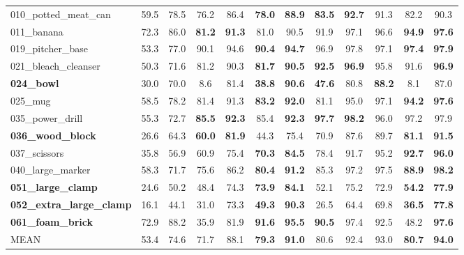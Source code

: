 \documentclass[twocolumn]{svjour3}
\begin{document}
\begin{table*}[t]
\begin{tabular}{l|c|c|c|c|c|c|c|c|c|c|c}
010\_potted\_meat\_can & 59.5 & 78.5 & 76.2 & 86.4 & \textbf{78.0} &\textbf{ 88.9} & \textbf{83.5} & \textbf{92.7} & 91.3 & 82.2 & 90.3 \\
011\_banana & 72.3 & 86.0 & \textbf{81.2 }& \textbf{91.3} & 81.0 & 90.5 & 91.9 & 97.1 & 96.6 & \textbf{94.9} & \textbf{97.6} \\
019\_pitcher\_base & 53.3 & 77.0 & 90.1 & 94.6 & \textbf{90.4} & \textbf{94.7} & 96.9 & 97.8 & 97.1 & \textbf{97.4} & \textbf{97.9} \\
021\_bleach\_cleanser & 50.3 & 71.6 & 81.2 & 90.3 & \textbf{81.7} &\textbf{ 90.5} & \textbf{92.5} & \textbf{96.9} & 95.8 & 91.6 & \textbf{96.9} \\
\textbf{024\_bowl} & 30.0 & 70.0 & 8.6 & 81.4 & \textbf{38.8} & \textbf{90.6} & \textbf{47.6} & 80.8 & \textbf{88.2} & 8.1 & 87.0 \\
025\_mug & 58.5 & 78.2 & 81.4 & 91.3 & \textbf{83.2} & \textbf{92.0} & 81.1 & 95.0 & 97.1 & \textbf{94.2} &\textbf{ 97.6} \\
035\_power\_drill & 55.3 & 72.7 & \textbf{85.5} & \textbf{92.3} & 85.4 & \textbf{92.3} & \textbf{97.7} & \textbf{98.2} & 96.0 & 97.2 & 97.9 \\
\textbf{036\_wood\_block} & 26.6 & 64.3 & \textbf{60.0} & \textbf{81.9} & 44.3 & 75.4 & 70.9 & 87.6 & 89.7 & \textbf{81.1} & \textbf{91.5} \\
037\_scissors & 35.8 & 56.9 & 60.9 & 75.4 & \textbf{70.3} & \textbf{84.5} & 78.4 & 91.7 & 95.2 & \textbf{92.7} & \textbf{96.0} \\
040\_large\_marker & 58.3 & 71.7 & 75.6 & 86.2 & \textbf{80.4} & \textbf{91.2} & 85.3 & 97.2 & 97.5 & \textbf{88.9} & \textbf{98.2} \\
\textbf{051\_large\_clamp} & 24.6 & 50.2 & 48.4 & 74.3 & \textbf{73.9} & \textbf{84.1} & 52.1 & 75.2 & 72.9 & \textbf{54.2} & \textbf{77.9} \\
\textbf{052\_extra\_large\_clamp} & 16.1 & 44.1 & 31.0 & 73.3 & \textbf{49.3} & \textbf{90.3} & 26.5 & 64.4 & 69.8 & \textbf{36.5} & \textbf{77.8} \\
\textbf{061\_foam\_brick} & 72.9 & 88.2 & 35.9 & 81.9 & \textbf{91.6} &\textbf{95.5} & \textbf{90.5} & 97.4 & 92.5 & 48.2 & \textbf{97.6} \\
\hline
MEAN & 53.4 & 74.6 & 71.7 & 88.1 & \textbf{79.3} & \textbf{91.0} & 80.6 & 92.4 & 93.0 & \textbf{80.7} & \textbf{94.0} \\


\hline
\end{tabular}
\label{table.ycb_results}
\end{table*}
\end{document}
